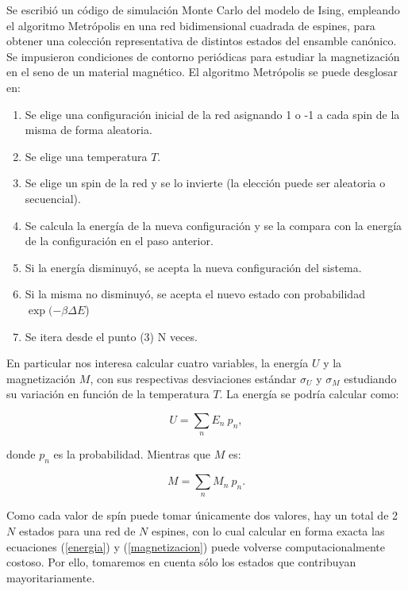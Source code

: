 \documentclass[twocolumn,Spanish,a4paper,11pt]{article}
\begin{document}
Se escribió un código de simulación Monte Carlo del
modelo de Ising, empleando el algoritmo Metrópolis
en una red bidimensional cuadrada de espines, para
obtener una colección representativa de distintos estados
del ensamble canónico. Se impusieron condiciones de
contorno periódicas para estudiar la magnetización en el seno de un material
magnético.
El algoritmo Metrópolis se puede desglosar en:

\begin{enumerate}
\item{Se elige una configuración inicial de la red
asignando 1 o -1 a cada spin de la misma de forma
aleatoria.}
\item{Se elige una temperatura $T$.}
\item{Se elige un spin de la red y se lo invierte (la elección
puede ser aleatoria o secuencial).}
\item{Se calcula la energía de la nueva configuración y se
la compara con la energía de la configuración en el
paso anterior.}
\item{Si la energía disminuyó, se acepta la nueva
configuración del sistema.}
\item{ Si la misma no disminuyó, se acepta el nuevo estado
con probabilidad $\exp({-\beta \Delta E}$})
\item{Se itera desde el punto (3) N veces.}
\end{enumerate}

En particular nos interesa calcular cuatro variables,
la energía $U$ y la magnetización $M$, con sus respectivas
desviaciones estándar $\sigma_U$ y $\sigma_M$ estudiando su variación
en función de la temperatura $T$.
La energía se podría calcular como:

\begin{equation}
U=\sum_{n}{E_n\ p_n},
\label{energia}
\end{equation}

donde $p_n$ es la probabilidad. Mientras que $M$ es:

\begin{equation}
M=\sum_{n}{M_n\ p_n}.
\label{magnetizacion}
\end{equation}

Como cada valor de spín puede tomar únicamente
dos valores, hay un total de 2$N$ estados para una red
de $N$ espines, con lo cual calcular en forma exacta las
ecuaciones (\ref{energia}) y (\ref{magnetizacion}) puede volverse computacionalmente
costoso. Por ello, tomaremos en cuenta sólo los estados
que contribuyan mayoritariamente.
\end{document}
